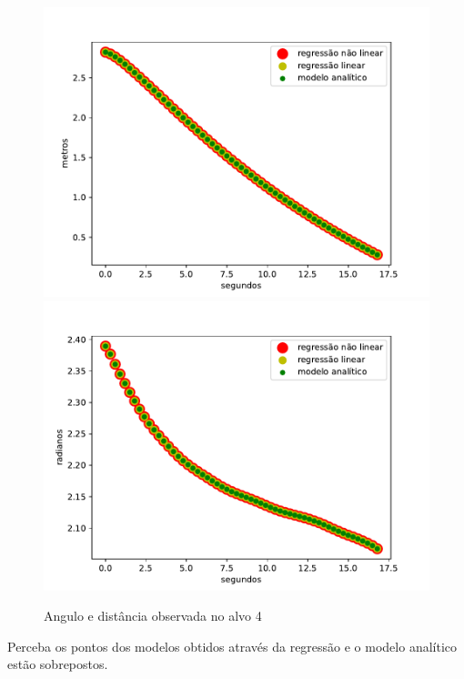 \begin{figure}[H]
    \centering
    \includegraphics[scale=0.45]{figuras/distance_over_time_4.pdf}
    \includegraphics[scale=0.45]{figuras/angle_over_time_4.pdf}
    \caption{Angulo e distância observada no alvo 4}
\end{figure}

Perceba os pontos dos modelos obtidos através da regressão e o modelo analítico
estão sobrepostos.

